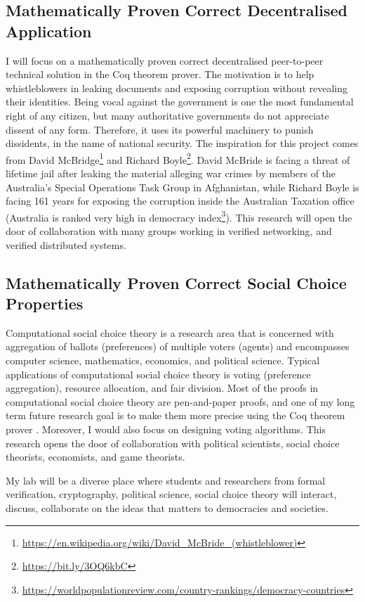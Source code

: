 \documentclass[a4paper]{article}
\begin{document}
 

\subsection{Mathematically Proven Correct Decentralised Application}
I will focus on a mathematically proven correct decentralised peer-to-peer technical solution 
\cite{liu2004linkable, Clarke2001, schimmer2009peer, 10.1145/1866307.1866346} in the Coq theorem prover. The motivation 
is to help 
whistleblowers in leaking documents and exposing corruption without revealing their identities.
Being vocal against the government is one the most fundamental right of any citizen, but many 
authoritative governments do not appreciate dissent of any form. Therefore, it uses 
its powerful machinery to punish dissidents, in the name of national security. 
The inspiration for this project comes from David McBridge\footnote{\url{https://en.wikipedia.org/wiki/David_McBride_(whistleblower)}} and 
Richard Boyle\footnote{\url{https://bit.ly/3OQ6kbC}}.
David McBride 
is facing a threat of lifetime jail after
leaking the material alleging war crimes by members of the Australia's Special Operations
Task Group in Afghanistan, while Richard Boyle is facing 161 years for exposing the corruption 
inside the Australian Taxation office
(Australia is ranked very high in 
democracy index\footnote{\url{https://worldpopulationreview.com/country-rankings/democracy-countries}}). 
This research will open the door of collaboration with many groups working in verified 
networking, and verified distributed systems. 

\subsection{Mathematically Proven Correct Social Choice Properties}
Computational social choice theory is a research area that is concerned
with aggregation of ballots (preferences)  of multiple voters (agents) and encompasses 
computer science, mathematics, economics, and political science. Typical applications of 
computational social choice theory is voting (preference aggregation), resource allocation, and fair division.
Most of the proofs in computational social choice theory are pen-and-paper proofs, 
and one of my long term future research goal is to make them more precise using the Coq theorem prover \cite{tiwari2021machine}.
Moreover, I would also focus on designing voting algorithms.
This research opens the door of collaboration with political scientists, 
social choice theorists, economists, and game theorists.


My lab will be a diverse place where students and researchers from formal 
verification, cryptography, 
political science, social choice theory will interact, discuss, 
collaborate on the ideas that matters to democracies and societies.


 

\end{document}
